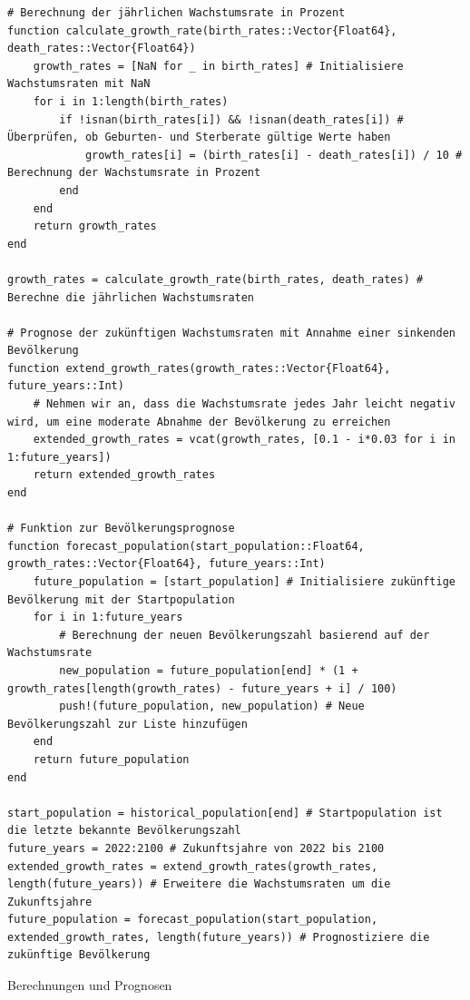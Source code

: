 \begin{listing}[H]
\begin{verbatim}
# Berechnung der jährlichen Wachstumsrate in Prozent
function calculate_growth_rate(birth_rates::Vector{Float64}, death_rates::Vector{Float64})
    growth_rates = [NaN for _ in birth_rates] # Initialisiere Wachstumsraten mit NaN
    for i in 1:length(birth_rates)
        if !isnan(birth_rates[i]) && !isnan(death_rates[i]) # Überprüfen, ob Geburten- und Sterberate gültige Werte haben
            growth_rates[i] = (birth_rates[i] - death_rates[i]) / 10 # Berechnung der Wachstumsrate in Prozent
        end
    end
    return growth_rates
end

growth_rates = calculate_growth_rate(birth_rates, death_rates) # Berechne die jährlichen Wachstumsraten

# Prognose der zukünftigen Wachstumsraten mit Annahme einer sinkenden Bevölkerung
function extend_growth_rates(growth_rates::Vector{Float64}, future_years::Int)
    # Nehmen wir an, dass die Wachstumsrate jedes Jahr leicht negativ wird, um eine moderate Abnahme der Bevölkerung zu erreichen
    extended_growth_rates = vcat(growth_rates, [0.1 - i*0.03 for i in 1:future_years])
    return extended_growth_rates
end

# Funktion zur Bevölkerungsprognose
function forecast_population(start_population::Float64, growth_rates::Vector{Float64}, future_years::Int)
    future_population = [start_population] # Initialisiere zukünftige Bevölkerung mit der Startpopulation
    for i in 1:future_years
        # Berechnung der neuen Bevölkerungszahl basierend auf der Wachstumsrate
        new_population = future_population[end] * (1 + growth_rates[length(growth_rates) - future_years + i] / 100)
        push!(future_population, new_population) # Neue Bevölkerungszahl zur Liste hinzufügen
    end
    return future_population
end

start_population = historical_population[end] # Startpopulation ist die letzte bekannte Bevölkerungszahl
future_years = 2022:2100 # Zukunftsjahre von 2022 bis 2100
extended_growth_rates = extend_growth_rates(growth_rates, length(future_years)) # Erweitere die Wachstumsraten um die Zukunftsjahre
future_population = forecast_population(start_population, extended_growth_rates, length(future_years)) # Prognostiziere die zukünftige Bevölkerung
\end{verbatim}    
\caption{Berechnungen und Prognosen}
\end{listing}

